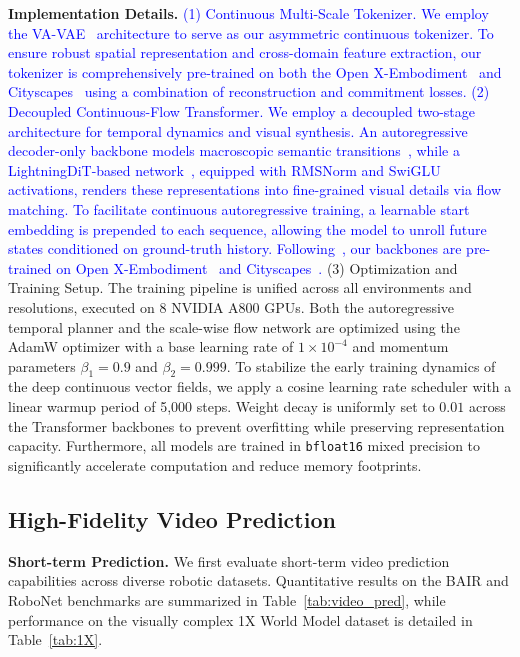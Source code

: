 \textbf{Implementation Details.} 
\textcolor{blue}{(1) Continuous Multi-Scale Tokenizer.
We employ the VA-VAE~\cite{yao2025reconstruction} architecture to serve as our asymmetric continuous tokenizer. To ensure robust spatial representation and cross-domain feature extraction, our tokenizer is comprehensively pre-trained on both the Open X-Embodiment~\cite{o2024open} and Cityscapes~\cite{Cityscapes} using a combination of reconstruction and commitment losses.
(2) Decoupled Continuous-Flow Transformer.
We employ a decoupled two-stage architecture for temporal dynamics and visual synthesis. An autoregressive decoder-only backbone models macroscopic semantic transitions~\cite{wang2025sampo}, while a LightningDiT-based network~\cite{yao2025reconstruction}, equipped with RMSNorm and SwiGLU activations, renders these representations into fine-grained visual details via flow matching. To facilitate continuous autoregressive training, a learnable start embedding is prepended to each sequence, allowing the model to unroll future states conditioned on ground-truth history. Following~\cite{wang2025sampo}, our backbones are pre-trained on Open X-Embodiment~\cite{o2024open} and Cityscapes~\cite{Cityscapes}.}
(3) Optimization and Training Setup.
The training pipeline is unified across all environments and resolutions, executed on 8 NVIDIA A800 GPUs. Both the autoregressive temporal planner and the scale-wise flow network are optimized using the AdamW optimizer with a base learning rate of $1 \times 10^{-4}$ and momentum parameters $\beta_1=0.9$ and $\beta_2=0.999$. To stabilize the early training dynamics of the deep continuous vector fields, we apply a cosine learning rate scheduler with a linear warmup period of 5,000 steps. Weight decay is uniformly set to $0.01$ across the Transformer backbones to prevent overfitting while preserving representation capacity. 
Furthermore, all models are trained in \texttt{bfloat16} mixed precision to significantly accelerate computation and reduce memory footprints.


\subsection{High-Fidelity Video Prediction}

\textbf{Short-term Prediction.}
We first evaluate short-term video prediction capabilities across diverse robotic datasets. Quantitative results on the BAIR and RoboNet benchmarks are summarized in Table~\ref{tab:video_pred}, while performance on the visually complex 1X World Model dataset is detailed in Table~\ref{tab:1X}.
 

